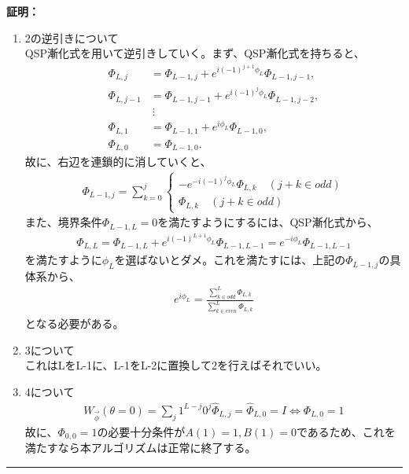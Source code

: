 \documentclass[a4paper,10.5pt]{article}
\numberwithin{equation}{section}
\newenvironment{proofbox}
{\begin{prooflabel}\textbf{証明：}\end{prooflabel}\vspace{0.8em}}
{\par\vspace{1em}\hrule\vspace{1em}}
\begin{document}
\begin{proofbox}
\begin{enumerate}
\begin{align*}
        \end{align*}
        実部、虚部ごとに係数比較し、まとめると、
        \begin{align*}
            \Phi_{L,j}=i^{j}\sum_{n=0}^{L-j}(a_{n}+ib_{n}){}_{\frac{L-n}{2}}C_{\frac{j}{2}}\quad (j\in even)
        \end{align*}
        また、jが奇数の時にも同様のことを行うと、
        \begin{align*}
            \Phi_{L,j}=i^{j}\sum_{n=0}^{L-j}(ic_{n}-id_{n}){}_{\frac{L-n}{2}}C_{\frac{j-n}{2}}\quad (j\in odd)
        \end{align*}
        \item 2の逆引きについて\\
        QSP漸化式を用いて逆引きしていく。まず、QSP漸化式を持ちると、
        \begin{align*}
    \Phi_{L,j}
    &= \Phi_{L-1,j}
    + e^{i(-1)^{j+1}\phi_L}\Phi_{L-1,j-1},\\
    \Phi_{L,j-1}
    &= \Phi_{L-1,j-1}
    + e^{i(-1)^j\phi_L}\Phi_{L-1,j-2},\\
    &\ \vdots\\
    \Phi_{L,1}
    &= \Phi_{L-1,1}
    + e^{i\phi_L}\Phi_{L-1,0},\\
    \Phi_{L,0}
    &= \Phi_{L-1,0}.
\end{align*}
故に、右辺を連鎖的に消していくと、
\begin{align*}
        \Phi_{L-1,j}=\sum_{k=0}^{j}\begin{cases}
            -e^{-i(-1)^{j}\phi_{L}}\Phi_{L,k}\quad (j+k\in odd)\\
            \Phi_{L,k}\quad (j+k\in odd)
        \end{cases}
\end{align*}
また、境界条件$\Phi_{L-1,L}=0$を満たすようにするには、QSP漸化式から、
\begin{align*}
    \Phi_{L,L}=\Phi_{L-1,L}+e^{i(-1)^{L+1}\phi_L}\Phi_{L-1,L-1}=e^{-i\phi_L}\Phi_{L-1,L-1}
\end{align*}
を満たすように$\phi_{L}$を選ばないとダメ。これを満たすには、上記の$\Phi_{L-1,j}$の具体系から、
\begin{align*}
    e^{i\phi_{L}}=\frac{\sum_{k\in odd}^{L}\Phi_{L,k}}{\sum_{k\in even}^{L}\Phi_{L,k}}
\end{align*}
となる必要がある。
\item 3について\\
これはLをL-1に、L-1をL-2に置換して2を行えばそれでいい。
\item 4について\\
\begin{align*}
            W_{\vec{\phi}}(\theta=0)=\sum_{j}1^{L-j}0^{j}\hat{\Phi}_{L,j}=\hat{\Phi}_{L,0}=I \iff \Phi_{L,0}=1
\end{align*}
故に、$\Phi_{0,0}=1$の必要十分条件が$A(1)=1,B(1)=0$であるため、これを満たすなら本アルゴリズムは正常に終了する。
\end{enumerate}
\end{proofbox}
\end{document}

